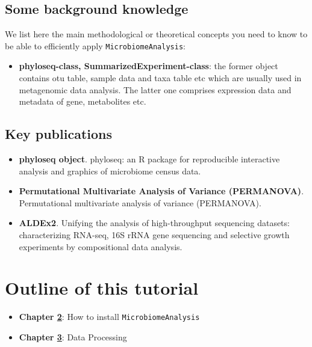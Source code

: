 \documentclass[
]{book}
\providecommand{\tightlist}{%
  \setlength{\itemsep}{0pt}\setlength{\parskip}{0pt}}
\begin{document}
\hypertarget{some-background-knowledge}{%
\subsection{Some background knowledge}\label{some-background-knowledge}}

We list here the main methodological or theoretical concepts you need to know to be able to efficiently apply \texttt{MicrobiomeAnalysis}:

\begin{itemize}
\tightlist
\item
  \textbf{phyloseq-class, SummarizedExperiment-class}: the former object contains otu table, sample data and taxa table etc which are usually used in metagenomic data analysis. The latter one comprises expression data and metadata of gene, metabolites etc.
\end{itemize}

\hypertarget{key-publications}{%
\subsection{Key publications}\label{key-publications}}

\begin{itemize}
\item
  \textbf{phyloseq object}. \citep{mcmurdie2013phyloseq} phyloseq: an R package for reproducible interactive analysis and graphics of microbiome census data.
\item
  \textbf{Permutational Multivariate Analysis of Variance (PERMANOVA)}. \citep{anderson2014permutational} Permutational multivariate analysis of variance (PERMANOVA).
\item
  \textbf{ALDEx2}. \citep{fernandes2014unifying} Unifying the analysis of high-throughput sequencing datasets: characterizing RNA-seq, 16S rRNA gene sequencing and selective growth experiments by compositional data analysis.
\end{itemize}

\hypertarget{outline-of-this-tutorial}{%
\section{Outline of this tutorial}\label{outline-of-this-tutorial}}

\begin{itemize}
\item
  \textbf{Chapter \href{https://zouhua.top/MicrobiomeAnalysis_book/how-to-install-microbiomeanalysis.html}{2}}: How to install \texttt{MicrobiomeAnalysis}
\item
  \textbf{Chapter \href{https://zouhua.top/MicrobiomeAnalysis_book/data-processing.html}{3}}: Data Processing
\end{itemize}
\end{document}
